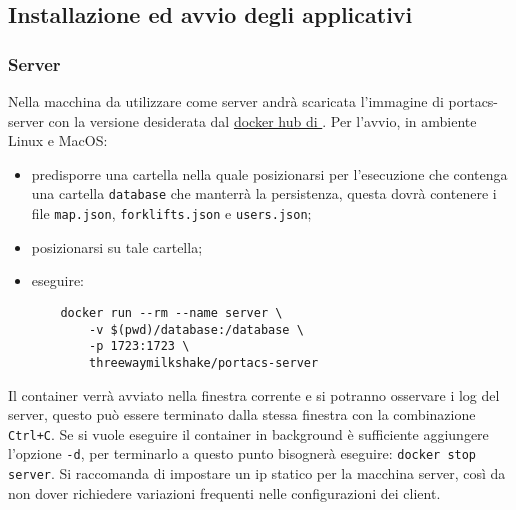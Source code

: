 \subsection{Installazione ed avvio degli applicativi}
    \subsubsection{Server}
    Nella macchina da utilizzare come server andrà scaricata l'immagine di portacs-server con la versione desiderata dal \href{https://hub.docker.com/r/threewaymilkshake}{docker hub di \group}.
    Per l'avvio, in ambiente Linux e MacOS:
    \begin{itemize}
        \item predisporre una cartella nella quale posizionarsi per l'esecuzione che contenga una cartella \texttt{database} che manterrà la persistenza, questa dovrà contenere i file \texttt{map.json}, \texttt{forklifts.json} e \texttt{users.json};
        \item posizionarsi su tale cartella;
        \item eseguire:
    \begin{verbatim}
    docker run --rm --name server \
        -v $(pwd)/database:/database \
        -p 1723:1723 \
        threewaymilkshake/portacs-server
    \end{verbatim}
    \end{itemize}
    Il container verrà avviato nella finestra corrente e si potranno osservare i log del server, questo può essere terminato dalla stessa finestra con la combinazione \texttt{Ctrl+C}. Se si vuole eseguire il container in background è sufficiente aggiungere l'opzione \texttt{-d}, per terminarlo a questo punto bisognerà eseguire: \texttt{docker stop server}.
    Si raccomanda di impostare un ip statico per la macchina server, così da non dover richiedere variazioni frequenti nelle configurazioni dei client.

